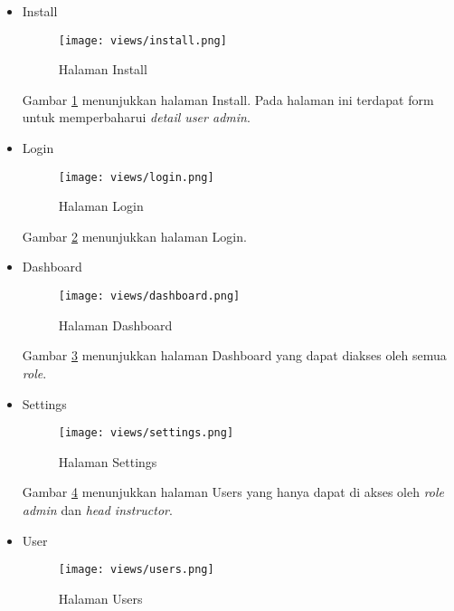 \begin{itemize}
      \item Install
            \begin{figure}[H]
                  \centering
                  \texttt{[image: views/install.png]}
                  \caption{Halaman Install}
                  \label{fig:3:1:1:install}
            \end{figure}

            Gambar \ref{fig:3:1:1:install} menunjukkan halaman Install. Pada halaman ini terdapat form untuk memperbaharui \textit{detail user admin}.

      \item Login
            \begin{figure}[H]
                  \centering
                  \texttt{[image: views/login.png]}
                  \caption{Halaman Login}
                  \label{fig:3:1:1:login}
            \end{figure}

            Gambar \ref{fig:3:1:1:login} menunjukkan halaman Login.
      \item Dashboard
            \begin{figure}[H]
                  \centering
                  \texttt{[image: views/dashboard.png]}
                  \caption{Halaman Dashboard}
                  \label{fig:3:1:1:dashboard}
            \end{figure}

            Gambar \ref{fig:3:1:1:dashboard} menunjukkan halaman Dashboard yang dapat diakses oleh semua \textit{role}.

      \item Settings
            \begin{figure}[H]
                  \centering
                  \texttt{[image: views/settings.png]}
                  \caption{Halaman Settings}
                  \label{fig:3:1:1:settings}
            \end{figure}

            Gambar \ref{fig:3:1:1:settings} menunjukkan halaman Users yang hanya dapat di akses oleh \textit{role admin} dan \textit{head instructor}.

      \item User
            \begin{figure}[H]
                  \centering
                  \texttt{[image: views/users.png]}
                  \caption{Halaman Users}
                  \label{fig:3:1:1:users}
            \end{figure}


\end{itemize}
